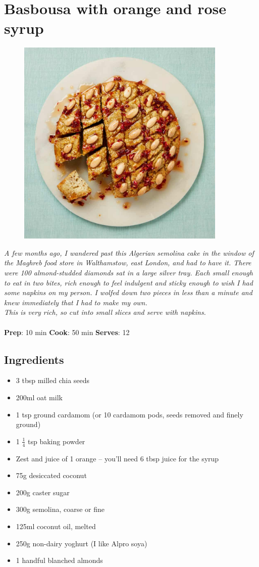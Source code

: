 \documentclass{book}
\begin{document}
\section{Basbousa with orange and rose syrup}
\begin{figure}
\centering\includegraphics[width=10cm,height=10cm,keepaspectratio]{Recipe_Pictures/Basbousa_with_orange_and_rose_syrup.png}
\end{figure}
\emph{A few months ago, I wandered past this Algerian semolina cake in the window of the Maghreb food store in Walthamstow, east London, and had to have it. There were 100 almond-studded diamonds sat in a large silver tray. Each small enough to eat in two bites, rich enough to feel indulgent and sticky enough to wish I had some napkins on my person. I wolfed down two pieces in less than a minute and knew immediately that I had to make my own.\\ 
This is very rich, so cut into small slices and serve with napkins.}\\\\ 
\textbf{Prep}: 10 min
\textbf{Cook}: 50 min
\textbf{Serves}: 12
\subsection*{Ingredients}
\begin{itemize}
\item 3 tbsp milled chia seeds
\item 200ml oat milk
\item 1 tsp ground cardamom (or 10 cardamom pods, seeds removed and finely ground)
\item 1 $\frac{1}{4}$ tsp baking powder
\item Zest and juice of 1 orange – you’ll need 6 tbsp juice for the syrup
\item 75g desiccated coconut
\item 200g caster sugar 
\item 300g semolina, coarse or fine
\item 125ml coconut oil, melted
\item 250g non-dairy yoghurt (I like Alpro soya)
\item 1 handful blanched almonds
\end{itemize}
\end{document}
